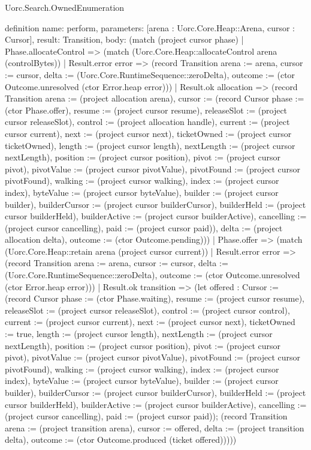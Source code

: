 \begin{lexlean}{Uorc.Search.OwnedEnumeration}
\begin{semanticmodule}
definition{
  name: perform,
  parameters: [arena : Uorc.Core.Heap::Arena, cursor : Cursor],
  result: Transition,
  body: (match (project cursor phase)
    | Phase.allocateControl => (match (Uorc.Core.Heap::allocateControl arena (controlBytes))
      | Result.error error => (record Transition {arena := arena, cursor := cursor, delta := (Uorc.Core.RuntimeSequence::zeroDelta), outcome := (ctor Outcome.unresolved (ctor Error.heap error))})
      | Result.ok allocation => (record Transition {arena := (project allocation arena), cursor := (record Cursor {phase := (ctor Phase.offer), resume := (project cursor resume), releaseSlot := (project cursor releaseSlot), control := (project allocation handle), current := (project cursor current), next := (project cursor next), ticketOwned := (project cursor ticketOwned), length := (project cursor length), nextLength := (project cursor nextLength), position := (project cursor position), pivot := (project cursor pivot), pivotValue := (project cursor pivotValue), pivotFound := (project cursor pivotFound), walking := (project cursor walking), index := (project cursor index), byteValue := (project cursor byteValue), builder := (project cursor builder), builderCursor := (project cursor builderCursor), builderHeld := (project cursor builderHeld), builderActive := (project cursor builderActive), cancelling := (project cursor cancelling), paid := (project cursor paid)}), delta := (project allocation delta), outcome := (ctor Outcome.pending)}))
    | Phase.offer => (match (Uorc.Core.Heap::retain arena (project cursor current))
      | Result.error error => (record Transition {arena := arena, cursor := cursor, delta := (Uorc.Core.RuntimeSequence::zeroDelta), outcome := (ctor Outcome.unresolved (ctor Error.heap error))})
      | Result.ok transition => (let offered : Cursor := (record Cursor {phase := (ctor Phase.waiting), resume := (project cursor resume), releaseSlot := (project cursor releaseSlot), control := (project cursor control), current := (project cursor current), next := (project cursor next), ticketOwned := true, length := (project cursor length), nextLength := (project cursor nextLength), position := (project cursor position), pivot := (project cursor pivot), pivotValue := (project cursor pivotValue), pivotFound := (project cursor pivotFound), walking := (project cursor walking), index := (project cursor index), byteValue := (project cursor byteValue), builder := (project cursor builder), builderCursor := (project cursor builderCursor), builderHeld := (project cursor builderHeld), builderActive := (project cursor builderActive), cancelling := (project cursor cancelling), paid := (project cursor paid)}); (record Transition {arena := (project transition arena), cursor := offered, delta := (project transition delta), outcome := (ctor Outcome.produced (ticket offered))})))
}
\end{semanticmodule}
\end{lexlean}
